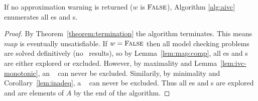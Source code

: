 \begin{theorem}
\label{theorem:aivc}
  If no approximation warning is returned ($w$ is $\textsc{False}$), Algorithm \ref{alg:aivc} enumerates all \mis es and \mivc s.
\end{theorem}

\begin{proof}
By Theorem~\ref{theorem:termination} the algorithm terminates. This
means $map$ is eventually unsatisfiable.  If $w = \textsc{False}$ then all model checking problems are solved definitively (no \unknown\ results), so by Lemma~\ref{lem:map:comp},
all \mis es and \mivc s are either explored or excluded.
However, by maximality and Lemma~\ref{lem:ivc-monotonic}, an \mis~ can never be
excluded. Similarily, by minimality and Corollary~\ref{lem:inadeq}, a
\mivc~ can never be excluded. Thus all \mis es and \mivc s are
explored and are elements of $A$ by the end of the algorithm.









%



\end{proof}
